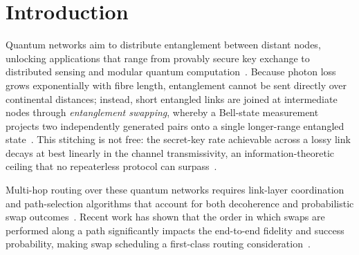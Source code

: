 \section{Introduction}

Quantum networks aim to distribute entanglement between distant nodes, unlocking
applications that range from provably secure key exchange to distributed sensing and
modular quantum computation~\cite{wehner2018quantum}. Because photon loss grows
exponentially with fibre length, entanglement cannot be sent directly over continental
distances; instead, short entangled links are joined at intermediate nodes through
\emph{entanglement swapping}, whereby a Bell-state measurement projects two independently
generated pairs onto a single longer-range entangled state~\cite{zukowski1993eventready}.
This stitching is not free: the secret-key rate achievable across a lossy link decays at
best linearly in the channel transmissivity, an information-theoretic ceiling that no
repeaterless protocol can surpass~\cite{wootters1998entanglement}.

Multi-hop routing over these quantum networks requires link-layer coordination and
path-selection algorithms that account for both decoherence and probabilistic
swap outcomes~\cite{pant2019routing,dahlberg2019linklayer}. Recent work has shown that
the order in which swaps are performed along a path significantly impacts the end-to-end
fidelity and success probability, making swap scheduling a first-class routing
consideration~\cite{bennett1993teleporting}.

